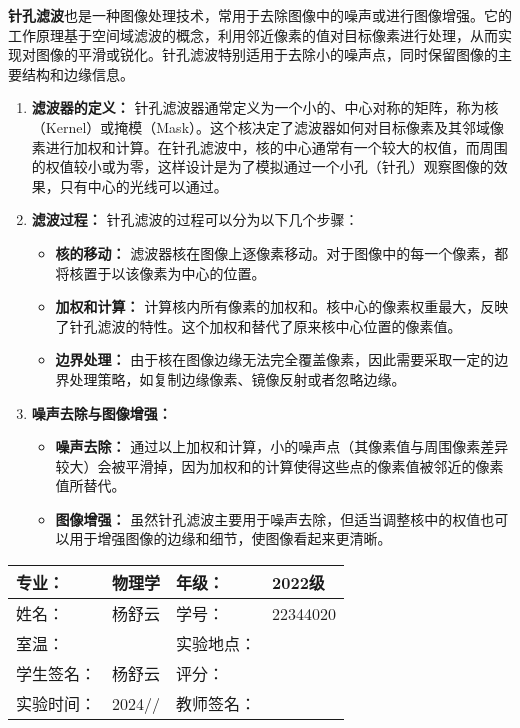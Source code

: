 \documentclass[dvipsnames, svgnames,a4paper,11pt]{article}
\begin{document}
	\textbf{针孔滤波}也是一种图像处理技术，常用于去除图像中的噪声或进行图像增强。它的工作原理基于空间域滤波的概念，利用邻近像素的值对目标像素进行处理，从而实现对图像的平滑或锐化。针孔滤波特别适用于去除小的噪声点，同时保留图像的主要结构和边缘信息。
	
	\begin{enumerate}
		\item \textbf{滤波器的定义：}
		针孔滤波器通常定义为一个小的、中心对称的矩阵，称为核（Kernel）或掩模（Mask）。这个核决定了滤波器如何对目标像素及其邻域像素进行加权和计算。在针孔滤波中，核的中心通常有一个较大的权值，而周围的权值较小或为零，这样设计是为了模拟通过一个小孔（针孔）观察图像的效果，只有中心的光线可以通过。
		
		\item \textbf{滤波过程：}
		针孔滤波的过程可以分为以下几个步骤：
		\begin{itemize}
			\item \textbf{核的移动：} 滤波器核在图像上逐像素移动。对于图像中的每一个像素，都将核置于以该像素为中心的位置。
			\item \textbf{加权和计算：} 计算核内所有像素的加权和。核中心的像素权重最大，反映了针孔滤波的特性。这个加权和替代了原来核中心位置的像素值。
			\item \textbf{边界处理：} 由于核在图像边缘无法完全覆盖像素，因此需要采取一定的边界处理策略，如复制边缘像素、镜像反射或者忽略边缘。
		\end{itemize}
		
		\item \textbf{噪声去除与图像增强：}
		\begin{itemize}
			\item \textbf{噪声去除：} 通过以上加权和计算，小的噪声点（其像素值与周围像素差异较大）会被平滑掉，因为加权和的计算使得这些点的像素值被邻近的像素值所替代。
			\item \textbf{图像增强：} 虽然针孔滤波主要用于噪声去除，但适当调整核中的权值也可以用于增强图像的边缘和细节，使图像看起来更清晰。
		\end{itemize}
	\end{enumerate}
	
	
	
	
	\clearpage
	
	\begin{table}
		\renewcommand\arraystretch{1.7}
		\centering
		\begin{tabularx}{\textwidth}{|X|X|X|X|}
			\hline
			专业： & 物理学 & 年级： & 2022级 \\
			\hline
			姓名： & 杨舒云 & 学号： & 22344020\\
			\hline
			室温： &  & 实验地点： &  \\
			\hline
			学生签名：& 杨舒云 & 评分： &\\
			\hline
			实验时间：& 2024// & 教师签名：&\\
			\hline
		\end{tabularx}
	\end{table}
	
\end{document}
